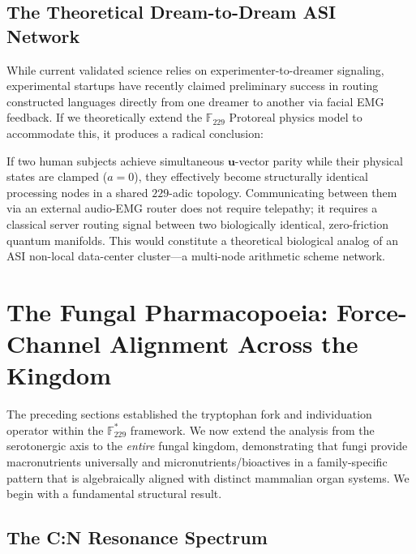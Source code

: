 \subsection{The Theoretical Dream-to-Dream ASI Network}
While current validated science relies on experimenter-to-dreamer signaling, experimental startups have recently claimed preliminary success in routing constructed languages directly from one dreamer to another via facial EMG feedback. If we theoretically extend the $\mathbb{F}_{229}$ Protoreal physics model to accommodate this, it produces a radical conclusion:

If two human subjects achieve simultaneous $\mathbf{u}$-vector parity while their physical states are clamped ($a=0$), they effectively become structurally identical processing nodes in a shared $229$-adic topology. Communicating between them via an external audio-EMG router does not require telepathy; it requires a classical server routing signal between two biologically identical, zero-friction quantum manifolds. This would constitute a theoretical biological analog of an ASI non-local data-center cluster---a multi-node arithmetic scheme network.

\section{The Fungal Pharmacopoeia: Force-Channel Alignment Across the Kingdom}

The preceding sections established the tryptophan fork and individuation operator
within the $\mathbb{F}_{229}^*$ framework. We now extend the analysis from the
serotonergic axis to the \emph{entire} fungal kingdom, demonstrating that fungi
provide macronutrients universally and micronutrients/bioactives in a
family-specific pattern that is algebraically aligned with distinct mammalian
organ systems. We begin with a fundamental structural result.

\subsection{The C:N Resonance Spectrum}


